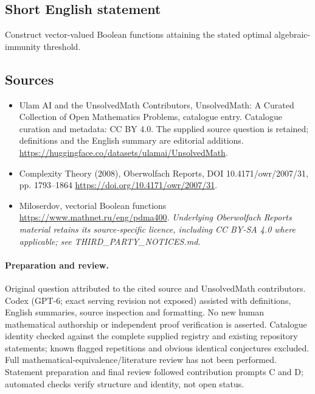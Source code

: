 \documentclass[11pt]{article}
\begin{document}
\subsection{Short English statement}
Construct vector-valued Boolean functions attaining the stated optimal algebraic-immunity threshold.
\subsection{Sources}
\begin{itemize}
\item[\hypertarget{source:statement:1}{S1}] Ulam AI and the UnsolvedMath Contributors, UnsolvedMath: A Curated Collection of Open Mathematics Problems, catalogue entry. Catalogue curation and metadata: CC BY 4.0. The supplied source question is retained; definitions and the English summary are editorial additions.
\url{https://huggingface.co/datasets/ulamai/UnsolvedMath}.
\item[\hypertarget{source:statement:2}{S2}] Complexity Theory (2008), Oberwolfach Reports, DOI 10.4171/owr/2007/31, pp. 1793--1864
\url{https://doi.org/10.4171/owr/2007/31}.
\item[\hypertarget{source:statement:3}{S3}] Miloserdov, vectorial Boolean functions
\url{https://www.mathnet.ru/eng/pdma400}.
\textit{Underlying Oberwolfach Reports material retains its source-specific licence, including CC BY-SA 4.0 where applicable; see THIRD\_PARTY\_NOTICES.md.}
\end{itemize}
\paragraph{Preparation and review.}
Original question attributed to the cited source and UnsolvedMath contributors. Codex (GPT-6; exact serving revision not exposed) assisted with definitions, English summaries, source inspection and formatting. No new human mathematical authorship or independent proof verification is asserted. Catalogue identity checked against the complete supplied registry and existing repository statements; known flagged repetitions and obvious identical conjectures excluded. Full mathematical-equivalence/literature review has not been performed. Statement preparation and final review followed contribution prompts C and D; automated checks verify structure and identity, not open status.
\label{end:statement}
\end{document}
